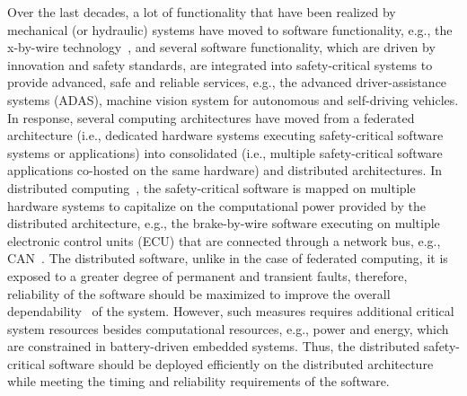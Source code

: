 Over the last decades, a lot of functionality that have been realized by mechanical (or hydraulic) systems have moved to software functionality, e.g., the x-by-wire technology~\cite{Navet2010DesignSystems}, and several software functionality, which are driven by innovation and safety standards, are integrated into safety-critical systems to provide advanced, safe and reliable services, e.g., the advanced driver-assistance systems (ADAS), machine vision system for autonomous and self-driving vehicles. In response, several computing architectures have moved from a federated architecture (i.e., dedicated hardware systems executing safety-critical software systems or applications) into consolidated (i.e., multiple safety-critical software applications co-hosted on the same hardware) and distributed architectures. In distributed computing~\cite{Kopetz2003Real-timeApplications}, the safety-critical software is mapped on multiple hardware systems to capitalize on the computational power provided by the distributed architecture, e.g., the brake-by-wire software executing on multiple electronic control units (ECU) that are connected through a network bus, e.g., CAN~\cite{Davis2007ControllerRevised}. The distributed software, unlike in the case of federated computing, it is exposed to a greater degree of permanent and transient faults, therefore, reliability of the software should be maximized to improve the overall dependability~\cite{} of the  system. However, such measures requires additional critical system resources besides computational resources, e.g., power and energy, which are constrained in battery-driven embedded systems. Thus, the distributed safety-critical software should be deployed efficiently on the distributed architecture while meeting the timing and reliability requirements of the software.


